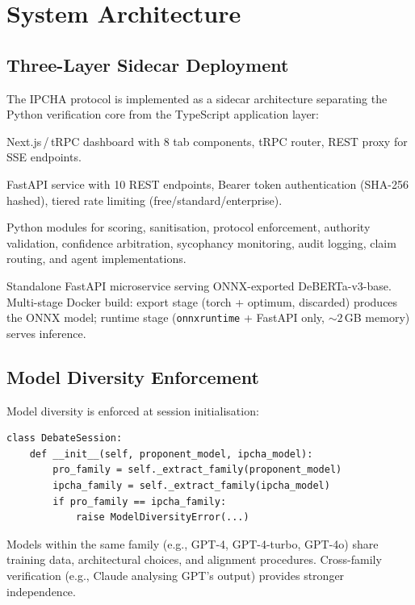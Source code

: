 \documentclass[11pt,a4paper]{article}
\begin{document}
\section{System Architecture}\label{sec:architecture}

\subsection{Three-Layer Sidecar Deployment}

The IPCHA protocol is implemented as a sidecar architecture
separating the Python verification core from the TypeScript
application layer:

\begin{description}[leftmargin=*,labelwidth=!,font=\bfseries]
  \item[Layer 3 (Interface)]
    Next.js\,/\,tRPC dashboard with 8 tab components, tRPC router,
    REST proxy for SSE endpoints.
  \item[Layer 2 (Sidecar, Port 8100)]
    FastAPI service with 10 REST endpoints, Bearer token
    authentication (SHA-256 hashed), tiered rate limiting
    (free/standard/enterprise).
  \item[Layer 1 (Core Verification)]
    Python modules for scoring, sanitisation, protocol enforcement,
    authority validation, confidence arbitration, sycophancy
    monitoring, audit logging, claim routing, and agent
    implementations.
  \item[DeBERTa-NLI Service (Port 8200)]
    Standalone FastAPI microservice serving ONNX-exported
    DeBERTa-v3-base.  Multi-stage Docker build: export stage
    (torch + optimum, discarded) produces the ONNX model; runtime
    stage (\texttt{onnxruntime} + FastAPI only, ${\sim}2$\,GB memory)
    serves inference.
\end{description}

\subsection{Model Diversity Enforcement}

Model diversity is enforced at session initialisation:
\begin{lstlisting}
class DebateSession:
    def __init__(self, proponent_model, ipcha_model):
        pro_family = self._extract_family(proponent_model)
        ipcha_family = self._extract_family(ipcha_model)
        if pro_family == ipcha_family:
            raise ModelDiversityError(...)
\end{lstlisting}
Models within the same family (e.g., GPT-4, GPT-4-turbo, GPT-4o)
share training data, architectural choices, and alignment procedures.
Cross-family verification (e.g., Claude analysing GPT's output)
provides stronger independence.
\end{document}
